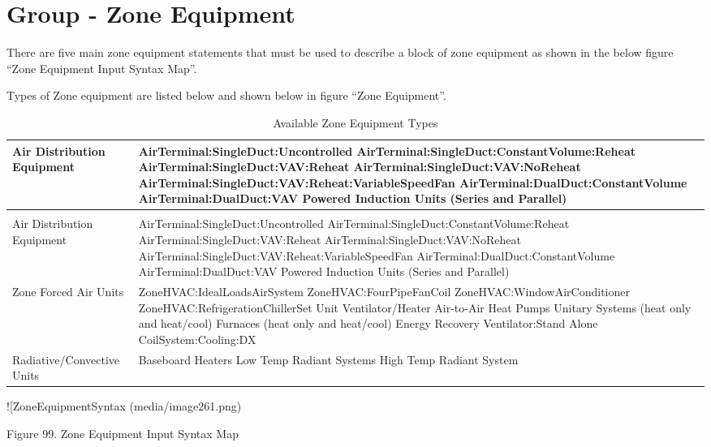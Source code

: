 \section{Group - Zone Equipment}\label{group---zone-equipment}

There are five main zone equipment statements that must be used to describe a block of zone equipment as shown in the below figure ``Zone Equipment Input Syntax Map''.

Types of Zone equipment are listed below and shown below in figure ``Zone Equipment''.

\begin{longtable}[c]{p{1.5in}p{4.5in}}
\caption{Available Zone Equipment Types \label{table:available-zone-equipment-types}} \tabularnewline
\toprule
Air Distribution Equipment & AirTerminal:SingleDuct:Uncontrolled    AirTerminal:SingleDuct:ConstantVolume:Reheat    AirTerminal:SingleDuct:VAV:Reheat    AirTerminal:SingleDuct:VAV:NoReheat    AirTerminal:SingleDuct:VAV:Reheat:VariableSpeedFan    AirTerminal:DualDuct:ConstantVolume    AirTerminal:DualDuct:VAV    Powered Induction Units (Series and Parallel) \tabularnewline
\midrule
\endfirsthead

\caption[]{Available Zone Equipment Types} \tabularnewline
\toprule
Air Distribution Equipment & AirTerminal:SingleDuct:Uncontrolled    AirTerminal:SingleDuct:ConstantVolume:Reheat    AirTerminal:SingleDuct:VAV:Reheat    AirTerminal:SingleDuct:VAV:NoReheat    AirTerminal:SingleDuct:VAV:Reheat:VariableSpeedFan    AirTerminal:DualDuct:ConstantVolume    AirTerminal:DualDuct:VAV    Powered Induction Units (Series and Parallel) \tabularnewline
\midrule
\endhead

Zone Forced Air Units ~ & ZoneHVAC:IdealLoadsAirSystem    ZoneHVAC:FourPipeFanCoil    ZoneHVAC:WindowAirConditioner    ZoneHVAC:RefrigerationChillerSet    Unit Ventilator/Heater    Air-to-Air Heat Pumps    Unitary Systems (heat only and heat/cool)    Furnaces (heat only and heat/cool)    Energy Recovery Ventilator:Stand Alone    CoilSystem:Cooling:DX \tabularnewline
Radiative/Convective Units & Baseboard Heaters    Low Temp Radiant Systems    High Temp Radiant System \tabularnewline
\bottomrule
\end{longtable}

!{[}ZoneEquipmentSyntax (media/image261.png)

Figure 99. Zone Equipment Input Syntax Map

